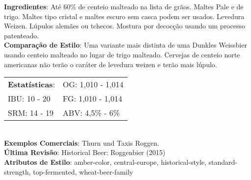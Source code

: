 \textbf{Ingredientes}: Até 60\% de centeio malteado na lista de grãos. Maltes Pale e de trigo. Maltes tipo cristal e maltes escuro sem casca podem ser usados. Levedura Weizen. Lúpulos alemães ou tchecos. Mostura por decocção usando um processo patenteado. \\
\textbf{Comparação de Estilo}: Uma variante mais distinta de uma Dunkles Weissbier usando centeio malteado no lugar de trigo malteado. Cervejas de centeio norte americanas não terão o caráter de levedura weizen e terão mais lúpulo. \\
\begin{tabular}{@{}p{35mm}p{35mm}@{}}
  \textbf{Estatísticas}: & OG: 1,010 - 1,014  \\
  IBU: 10 - 20  & FG: 1,010 - 1,014  \\
  SRM: 14 - 19 & ABV: 4,5\% - 6\%
\end{tabular}\\
\textbf{Exemplos Comerciais}: Thurn und Taxis Roggen. \\
\textbf{Última Revisão}: Historical Beer: Roggenbier (2015) \\
\textbf{Atributos de Estilo}: amber-color, central-europe, historical-style, standard-strength, top-fermented, wheat-beer-family
